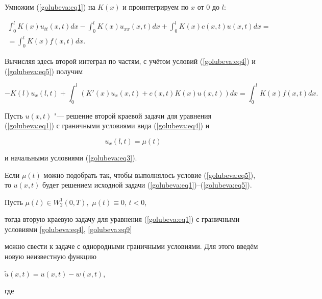  Умножим (\ref{golubeva:eq1}) на $K(x)$ и проинтегрируем по $x$ от $0$ до $l$:

\begin{multline*}

\int _{0}^{l}K(x)u_{tt}(x, t)dx-\int _{0}^{l}K(x)u_{xx}(x, t)dx+\int _{0}^{l}K(x)c(x, t)u(x, t)dx=\\

=\int _{0}^{l}K(x)f(x, t)dx.

\end{multline*}

Вычисляя здесь второй интеграл по частям, с учётом условий (\ref{golubeva:eq4}) и (\ref{golubeva:eq5}) получим

\begin{equation}

\label{golubeva:eq8}

-K(l)u_{x}(l, t)+\int _{0}^{l}(K'(x)u_{x}(x, t)+c(x, t)K(x)u(x, t))dx%

=\int _{0}^{l}K(x)f(x, t)dx.

\end{equation}

 Пусть $u(x, t)$ "--- решение второй краевой задачи для уравнения (\ref{golubeva:eq1}) с граничными условиями вида (\ref{golubeva:eq4}) и

\begin{equation}

\label{golubeva:eq9}

u_{x}(l, t)=\mu (t)

\end{equation}

и начальными условиями (\ref{golubeva:eq3}).



Если $\mu (t)$ можно подобрать так, чтобы выполнялось условие (\ref{golubeva:eq5}), то $u(x, t)$ будет решением исходной задачи (\ref{golubeva:eq1})--(\ref{golubeva:eq5}).



Пусть $\mu (t)\in W_{2}^{1}(0,T),$ $\mu (t)\equiv 0$, $t<0$,

тогда вторую краевую задачу для уравнения (\ref{golubeva:eq1}) с граничными условиями \eqref{golubeva:eq4}, \eqref{golubeva:eq9}

можно свести к задаче с однородными граничными условиями. Для этого введём новую неизвестную функцию

$\tilde {u} (x, t)=u(x, t)-w(x, t)$,

где

